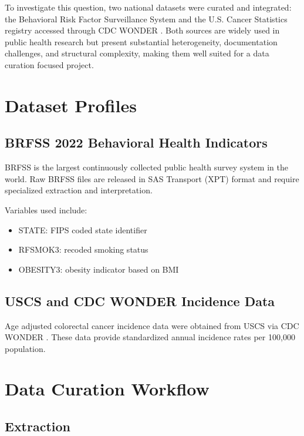 \documentclass[12pt]{article}
\begin{document}
To investigate this question, two national datasets were curated and integrated: the Behavioral Risk Factor Surveillance System \parencite{cdc2023brfss} and the U.S. Cancer Statistics registry accessed through CDC WONDER \parencite{cdc2024uscs}. Both sources are widely used in public health research but present substantial heterogeneity, documentation challenges, and structural complexity, making them well suited for a data curation focused project.

\section{Dataset Profiles}

\subsection{BRFSS 2022 Behavioral Health Indicators}

BRFSS \parencite{cdc2023brfss} is the largest continuously collected public health survey system in the world. Raw BRFSS files are released in SAS Transport (XPT) format and require specialized extraction and interpretation.

Variables used include:
\begin{itemize}
    \item STATE: FIPS coded state identifier
    \item RFSMOK3: recoded smoking status
    \item OBESITY3: obesity indicator based on BMI
\end{itemize}

\subsection{USCS and CDC WONDER Incidence Data}

Age adjusted colorectal cancer incidence data were obtained from USCS via CDC WONDER \parencite{cdc2024uscs}. These data provide standardized annual incidence rates per 100,000 population.

\section{Data Curation Workflow}

\subsection{Extraction}
\end{document}
